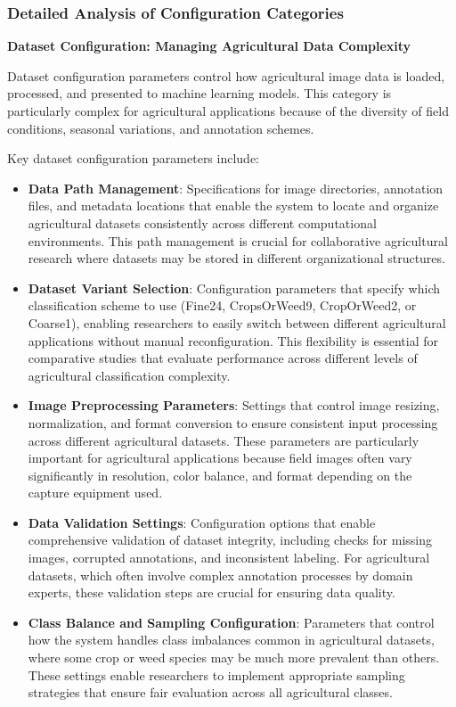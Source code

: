 \subsubsection{Detailed Analysis of Configuration Categories}

\textbf{Dataset Configuration: Managing Agricultural Data Complexity}

Dataset configuration parameters control how agricultural image data is loaded, processed, and presented to machine learning models. This category is particularly complex for agricultural applications because of the diversity of field conditions, seasonal variations, and annotation schemes.

Key dataset configuration parameters include:

\begin{itemize}
    \item \textbf{Data Path Management}: Specifications for image directories, annotation files, and metadata locations that enable the system to locate and organize agricultural datasets consistently across different computational environments. This path management is crucial for collaborative agricultural research where datasets may be stored in different organizational structures.
    
    \item \textbf{Dataset Variant Selection}: Configuration parameters that specify which classification scheme to use (Fine24, CropsOrWeed9, CropOrWeed2, or Coarse1), enabling researchers to easily switch between different agricultural applications without manual reconfiguration. This flexibility is essential for comparative studies that evaluate performance across different levels of agricultural classification complexity.
    
    \item \textbf{Image Preprocessing Parameters}: Settings that control image resizing, normalization, and format conversion to ensure consistent input processing across different agricultural datasets. These parameters are particularly important for agricultural applications because field images often vary significantly in resolution, color balance, and format depending on the capture equipment used.
    
    \item \textbf{Data Validation Settings}: Configuration options that enable comprehensive validation of dataset integrity, including checks for missing images, corrupted annotations, and inconsistent labeling. For agricultural datasets, which often involve complex annotation processes by domain experts, these validation steps are crucial for ensuring data quality.
    
    \item \textbf{Class Balance and Sampling Configuration}: Parameters that control how the system handles class imbalances common in agricultural datasets, where some crop or weed species may be much more prevalent than others. These settings enable researchers to implement appropriate sampling strategies that ensure fair evaluation across all agricultural classes.
\end{itemize}

